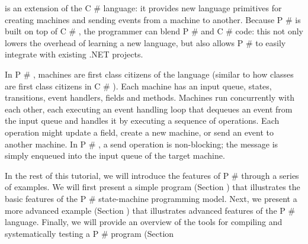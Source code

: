 \documentclass{article}
\begin{document}
\begin{mdDiv}[class={body,madoko},elem={body},line-adjust={0}]
\begin{mdP}[data-line={30}]
{} is an extension of the C%
{}\#%
{} language: it
provides new language primitives for creating machines and sending events from a
machine to another. Because P%
{}\#%
{} is built on top of C%
{}\#%
{}, the programmer can blend P%
{}\#%
{} and
C%
{}\#%
{} code: this not only lowers the overhead of learning a new language, but also
allows P%
{}\#%
{} to easily integrate with existing .NET projects.%
\end{mdP}%
\begin{mdP}[class={indent},data-line={40}]%
{}In P%
{}\#%
{}, machines are first class citizens of the language (similar to how classes are
first class citizens in C%
{}\#%
{}). Each machine has an input queue, states, transitions,
event handlers, fields and methods. Machines run concurrently with each other, each
executing an event handling loop that dequeues an event from the input queue and
handles it by executing a sequence of operations. Each operation might update a field,
create a new machine, or send an event to another machine. In P%
{}\#%
{}, a send operation is
non-blocking; the message is simply enqueued into the input queue of the target machine.%
\end{mdP}%
\begin{mdP}[class={indent},data-line={48}]%
{}In the rest of this tutorial, we will introduce the features of P%
{}\#%
{} through a series of
examples.
We will first present a simple program (Section%
{}{\mdNbsp}%
{}) that illustrates
the basic features of the P%
{}\#%
{} state-machine programming model.
Next, we present a more advanced example (Section%
{}{\mdNbsp}%
{}) that illustrates
advanced features of the P%
{}\#%
{} language.
Finally, we will provide an overview of the tools for compiling and systematically testing
a P%
{}\#%
{} program (Section%

\end{mdP}
\end{mdDiv}
\end{document}
